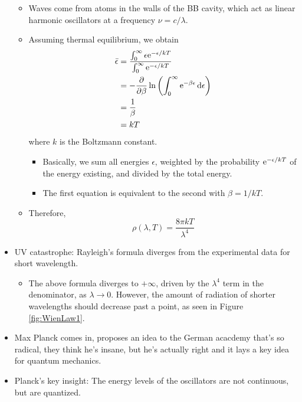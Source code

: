 \documentclass[../notes.tex]{subfiles}
\begin{document}
\begin{itemize}
\begin{itemize}
\begin{equation*}
        \end{equation*}
        \item Waves come from atoms in the walls of the BB cavity, which act as linear harmonic oscillators at a frequency $\nu=c/\lambda$.
        \item Assuming thermal equilibrium, we obtain
        \begin{align*}
            \bar{\epsilon} &= \frac{\int_0^\infty\epsilon\e[-\epsilon/kT]}{\int_0^\infty\e[-\epsilon/kT]}\\
            &= -\pdv{\beta}\ln\left( \int_0^\infty\e[-\beta\epsilon]\dd{\epsilon} \right)\\
            &= \frac{1}{\beta}\\
            &= kT
        \end{align*}
        where $k$ is the Boltzmann constant.
        \begin{itemize}
            \item Basically, we sum all energies $\epsilon$, weighted by the probability $\e[-\epsilon/kT]$ of the energy existing, and divided by the total energy.
            \item The first equation is equivalent to the second with $\beta=1/kT$.
        \end{itemize}
        \item Therefore,
        \begin{equation*}
            \rho(\lambda,T) = \frac{8\pi kT}{\lambda^4}
        \end{equation*}
    \end{itemize}
    \item UV catastrophe: Rayleigh's formula diverges from the experimental data for short wavelength.
    \begin{itemize}
        \item The above formula diverges to $+\infty$, driven by the $\lambda^4$ term in the denominator, as $\lambda\to 0$. However, the amount of radiation of shorter wavelengths should decrease past a point, as seen in Figure \ref{fig:WienLaw1}.
    \end{itemize}
    \item Max Planck comes in, proposes an idea to the German acacdemy that's so radical, they think he's insane, but he's actually right and it lays a key idea for quantum mechanics.
    \item Planck's key insight: The energy levels of the oscillators are not continuous, but are quantized.
    \begin{itemize}

\end{itemize}
\end{itemize}
\end{document}

